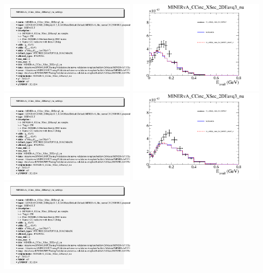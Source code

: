 \documentclass{article}
\begin{document}
\includegraphics[width=0.49\textwidth]{figures/cc_visEq3_xsec_CV_WithErr_info.png}
\centering
\includegraphics[width=0.49\textwidth]{figures/cc_visEq3_xsec_CV_WithErr_slice_3_comp.png}
\includegraphics[width=0.49\textwidth]{figures/cc_visEq3_xsec_CV_WithErr_info.png}
\centering
\includegraphics[width=0.49\textwidth]{figures/cc_visEq3_xsec_CV_WithErr_slice_4_comp.png}
\includegraphics[width=0.49\textwidth]{figures/cc_visEq3_xsec_CV_WithErr_info.png}
\end{document}
